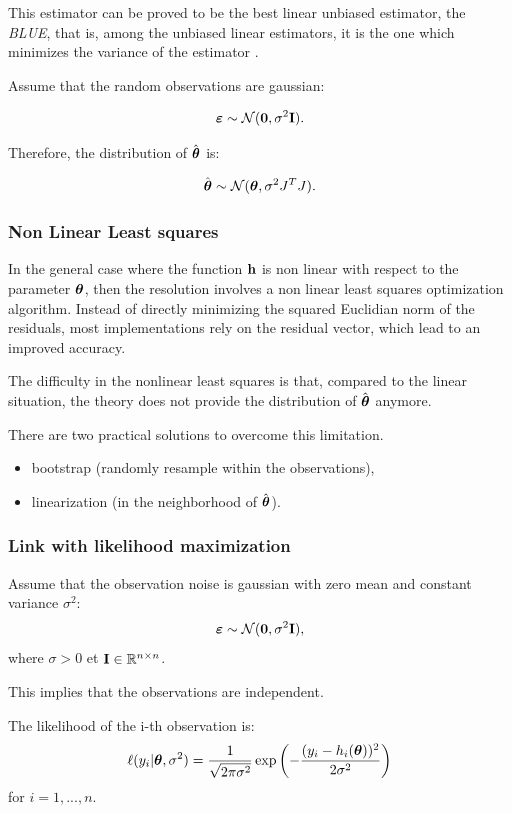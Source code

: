 \documentclass{beamer}
\begin{document}

\begin{frame}
This estimator can be proved to be the best linear unbiased estimator,
the \emph{BLUE}, that is, among the unbiased linear estimators, it is the one
which minimizes the variance of the estimator \cite{BinghamFry, Sen1990}.

Assume that the random observations are gaussian:

$$
\boldsymbol{\varepsilon} \sim \mathcal{N}(\boldsymbol{0},\sigma^2 {\bf I}).
$$

Therefore, the distribution of $\hat{\boldsymbol{\theta}}$ is:

$$
\hat{\boldsymbol{\theta}} \sim \mathcal{N}(\boldsymbol{\theta},\sigma^2 J^T J).
$$


\end{frame}


\begin{frame}
\frametitle{Non Linear Least squares}

In the general case where the function ${\bf h}$ is non linear
with respect to the parameter $\boldsymbol{\theta}$, then the resolution
involves a non linear least squares optimization algorithm. Instead of
directly minimizing the squared Euclidian norm of the residuals, most
implementations rely on the residual vector, which lead to an improved
accuracy.

The difficulty in the nonlinear least squares is that, compared to the
linear situation, the theory does not provide the distribution of
$\hat{\boldsymbol{\theta}}$ anymore.

There are two practical solutions to overcome this limitation.
\begin{itemize}
\item bootstrap (randomly resample within the observations),
\item linearization (in the neighborhood of $\hat{\boldsymbol{\theta}}$).
\end{itemize}

\end{frame}


\begin{frame}
\frametitle{Link with likelihood maximization}
Assume that the observation noise is gaussian with zero mean and constant 
variance $\sigma^2$: 
$$
\boldsymbol{\varepsilon} \sim \mathcal{N}({\bf 0},\sigma^2 {\bf I}),
$$ 
where $\sigma>0$ et ${\bf I}\in\mathbb{R}^{n\times n}$. 

This implies that the observations are independent. 

The likelihood of the i-th observation is:
$$
\ell(y_i|\boldsymbol{\theta},\sigma^2) = 
\frac{1}{\sqrt{2\pi \sigma^2}} 
\exp\left(-\frac{(y_i - h_i(\boldsymbol{\theta}))^2}{2 \sigma^2}\right)
$$
for $i=1,...,n$. 
\end{frame}
\end{document}
